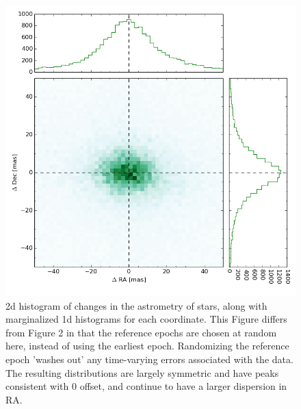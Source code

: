 \documentclass[modern]{aastex61}
\begin{document}
\begin{figure}
	\includegraphics[width=.9\textwidth]{ra_dec_random.png}
    \caption{2d histogram of changes in the astrometry of stars, along with marginalized 1d histograms for each coordinate. This Figure differs from Figure 2 in that the reference epochs are chosen at random here, instead of using the earliest epoch. Randomizing the reference epoch 'washes out' any time-varying errors associated with the data. The resulting distributions are largely symmetric and have peaks consistent with 0 offset, and continue to have a larger dispersion in RA.}
\end{figure}
\end{document}
